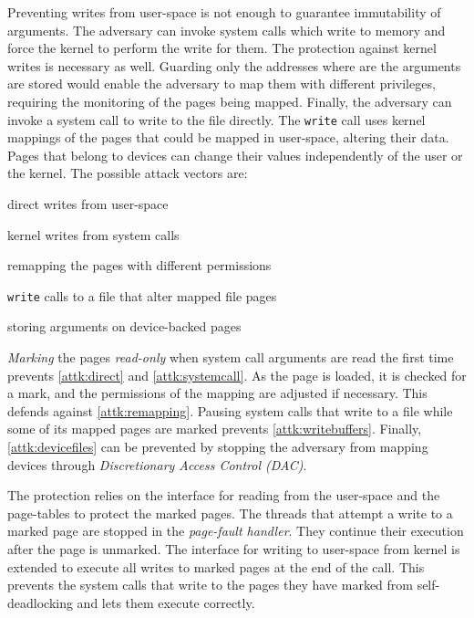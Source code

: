\documentclass[conference]{IEEEtran}
\newcommand{\mat}[1]{\textcolor{red}{\textbf{Mat:} #1}}
\begin{document}
Preventing writes from user-space is not enough to guarantee immutability of
arguments. The adversary can invoke system calls which write to memory and force
the kernel to perform the write for them. The protection against kernel writes
is necessary as well. Guarding only the addresses where are the arguments are
stored would enable the adversary to map them with different privileges,
requiring the monitoring of the pages being mapped. Finally, the adversary can
invoke a system call to write to the file directly. The \texttt{write} call uses
kernel mappings of the pages that could be mapped in user-space, altering their
data. Pages that belong to devices can change their values independently of the 
user or the kernel. The possible attack vectors are:
\begin{enumerate*}[label=(\roman*)]
\item \label{attk:direct} direct writes from user-space
\item \label{attk:systemcall} kernel writes from system calls
\item \label{attk:remapping} remapping the pages with different permissions
\item \label{attk:writebuffers}\texttt{write} calls to a file that alter mapped file pages
\item \label{attk:devicefiles} storing arguments on device-backed pages
\end{enumerate*}

\emph{Marking} the pages \emph{read-only} when system call arguments are read
the first time prevents \autoref{attk:direct} and \autoref{attk:systemcall}.
As the page is loaded, it is checked for a mark, and the permissions of the 
mapping are adjusted if necessary. This defends against \autoref{attk:remapping}.
Pausing system calls that write to a file while some of its mapped pages are
marked prevents \autoref{attk:writebuffers}. Finally, \autoref{attk:devicefiles}
can be prevented by stopping the adversary from mapping devices through
\emph{Discretionary Access Control (DAC)}.

The protection relies on the interface for reading from the user-space and the
page-tables to protect the marked pages. The threads that attempt a write to a
marked page are stopped in the \emph{page-fault handler}. They continue their
execution after the page is unmarked. The interface for writing to user-space
from kernel is extended to execute all writes to marked pages at the end of the
call. This prevents the system calls that write to the pages they have marked
from self-deadlocking and lets them execute correctly.
\end{document}
